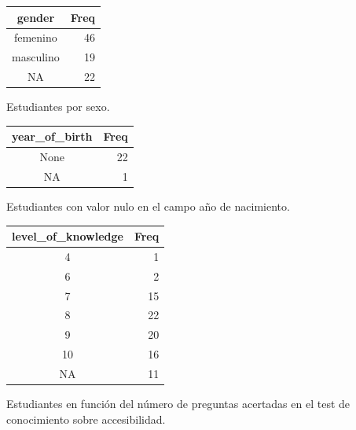 \documentclass[
  12pt,
  a4paper,
  extrafontsizes,
  onecolumn,
  openright,
  table]{memoir}
\begin{document}
\begin{table}

\caption{\label{tbl-contingencia-eco}Tablas de contingencia de la
información del sexo, edad y nivel de conocimientos
previos.}\begin{minipage}[t]{0.50\linewidth}

{\centering 

\hypertarget{tbl-contingencia-eco-1}{}
\begin{longtable}{cr}
\tabularnewline

\toprule
gender & Freq \\ 
\midrule
femenino & 46 \\ 
masculino & 19 \\ 
NA & 22 \\ 
\bottomrule
\end{longtable}

Estudiantes por sexo.

}

\end{minipage}%
%
\begin{minipage}[t]{0.50\linewidth}

{\centering 

\hypertarget{tbl-contingencia-eco-2}{}
\begin{longtable}{cr}
\tabularnewline

\toprule
year\_of\_birth & Freq \\ 
\midrule
None & 22 \\ 
NA & 1 \\ 
\bottomrule
\end{longtable}

Estudiantes con valor nulo en el campo año de nacimiento.

}

\end{minipage}%
\newline
\begin{minipage}[t]{0.50\linewidth}

{\centering 

\hypertarget{tbl-contingencia-eco-3}{}
\begin{longtable}{cr}
\tabularnewline

\toprule
level\_of\_knowledge & Freq \\ 
\midrule
4 & 1 \\ 
6 & 2 \\ 
7 & 15 \\ 
8 & 22 \\ 
9 & 20 \\ 
10 & 16 \\ 
NA & 11 \\ 
\bottomrule
\end{longtable}

Estudiantes en función del número de preguntas acertadas en el test de
conocimiento sobre accesibilidad.

}

\end{minipage}%

\end{table}
\end{document}
